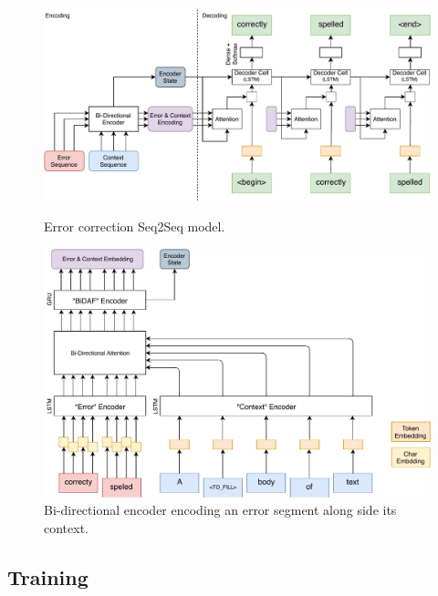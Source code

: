 \begin{figure}
    \centering
    \includegraphics[width=.8\linewidth]{diagrams/correction-seq2seq-model.pdf}
    \caption{Error correction Seq2Seq model.}
    \label{fig:correction-model-struct}
    \centering
    \includegraphics[width=.8\linewidth]{diagrams/bidaf-encoder.pdf}
    \caption{Bi-directional encoder encoding an error segment along side its context.}
    \label{fig:bidaf-encoder}
\end{figure}

\subsection{Training}

